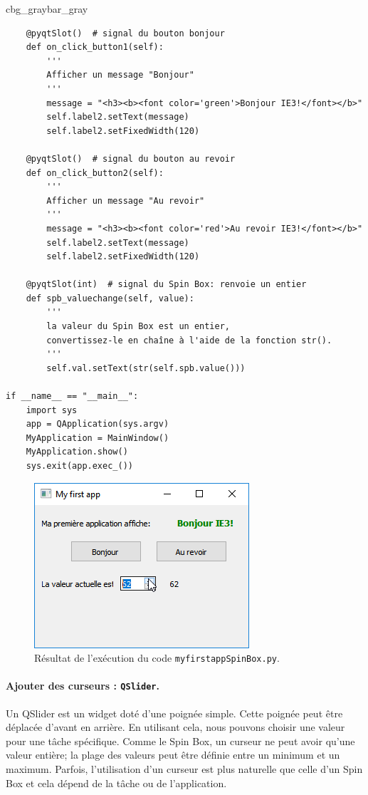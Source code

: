 \documentclass[%
oneside,                 %
final,                   %
10pt,french]{article}
\newenvironment{_pro_tight}[2]{
   \def\FrameCommand{\color{#2}\vrule width 1mm\normalcolor\colorbox{#1}}
   \FrameRule0.6pt\MakeFramed {\advance\hsize-2mm\FrameRestore}\vskip3mm}
   {\vskip0mm\endMakeFramed}
\newenvironment{pro}[2]{
\bgroup\rmfamily
\fboxsep=0mm\relax
\begin{_pro_tight}{#1}{#2}
\list{}{\parsep=-2mm\parskip=0mm\topsep=0pt\leftmargin=2mm
\rightmargin=2\leftmargin\leftmargin=4pt\relax}
\item\relax}
{\endlist\end{_pro_tight}\egroup}
\begin{document}
\begin{pro}{cbg_gray}{bar_gray}
\begin{verbatim}
    @pyqtSlot()  # signal du bouton bonjour
    def on_click_button1(self):
        '''
        Afficher un message "Bonjour"
        '''
        message = "<h3><b><font color='green'>Bonjour IE3!</font></b>"
        self.label2.setText(message)
        self.label2.setFixedWidth(120)

    @pyqtSlot()  # signal du bouton au revoir
    def on_click_button2(self):
        '''
        Afficher un message "Au revoir"
        '''
        message = "<h3><b><font color='red'>Au revoir IE3!</font></b>"
        self.label2.setText(message)
        self.label2.setFixedWidth(120)

    @pyqtSlot(int)  # signal du Spin Box: renvoie un entier
    def spb_valuechange(self, value):
        '''
        la valeur du Spin Box est un entier,
        convertissez-le en chaîne à l'aide de la fonction str().
        '''
        self.val.setText(str(self.spb.value()))

if __name__ == "__main__":
    import sys
    app = QApplication(sys.argv)
    MyApplication = MainWindow()
    MyApplication.show()
    sys.exit(app.exec_())
\end{verbatim}
\end{pro}
\noindent


\begin{figure}[!ht]  %
  \centerline{\includegraphics[width=0.7\linewidth]{imgs/myfirstappSpinBox2.png}}
  \caption{
  Résultat de l'exécution du code \texttt{myfirstappSpinBox.py}. \label{fig:myfirstappSpinBox}
  }
\end{figure}


\paragraph{Ajouter des curseurs : \texttt{QSlider}.}
Un QSlider est un widget doté d'une poignée simple. Cette poignée peut être déplacée d'avant en arrière. En utilisant cela, nous pouvons choisir une valeur pour une tâche spécifique. Comme le Spin Box, un curseur ne peut avoir qu'une valeur entière; la plage des valeurs peut être définie entre un minimum et un maximum. Parfois, l’utilisation d’un curseur est plus naturelle que celle d’un Spin Box et cela dépend de la tâche ou de l’application.
\end{document}
